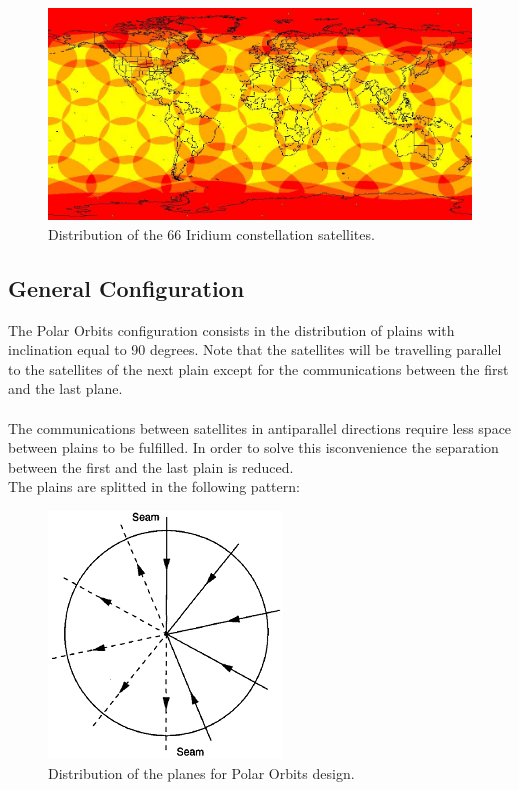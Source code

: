 \begin{figure}[H]
\begin{center}
\includegraphics[scale=0.6]{PolarOrbits/Iridium.jpg}
\caption{Distribution of the 66 Iridium constellation satellites.}
\end{center}
\end{figure} 

\subsection{General Configuration}
The Polar Orbits configuration consists in the distribution of plains with inclination equal to 90 degrees. Note that the satellites will be travelling parallel to the satellites of the next plain except for the communications between the first and the last plane. 
\\
\\
The communications between satellites in antiparallel directions require less space between plains to be fulfilled. In order to solve this isconvenience the separation between the first and the last plain is reduced.
\\
The plains are splitted in the following pattern:

\begin{figure}[H]
\begin{center}
\includegraphics[scale=0.6]{PolarOrbits/planeconfig.png}
\caption{Distribution of the planes for Polar Orbits design.}
\end{center}
\end{figure}

